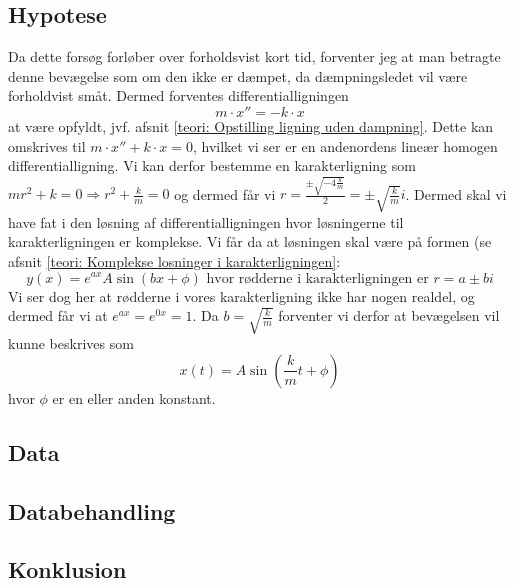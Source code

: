 \subsection{Hypotese}
Da dette forsøg forløber over forholdsvist kort tid, forventer jeg at man betragte denne bevægelse som om den ikke er dæmpet, da dæmpningsledet vil være forholdvist småt. 
Dermed forventes differentialligningen 
$$m\cdot x'' = -k \cdot x$$
at være opfyldt, jvf. afsnit \ref{teori: Opstilling ligning uden dampning}.
Dette kan omskrives til $m\cdot x'' + k\cdot x=0$, hvilket vi ser er en andenordens lineær homogen differentialligning. 
Vi kan derfor bestemme en karakterligning som $mr^2 + k = 0 \Rightarrow r^2 + \frac{k}{m} = 0$ og dermed får vi $r = \frac{\pm \sqrt{-4\frac{k}{m}}}{2}=\pm\sqrt{\frac{k}{m}}i$.
Dermed skal vi have fat i den løsning af differentialligningen hvor løsningerne til karakterligningen er komplekse. 
Vi får da at løsningen skal være på formen (se afsnit \ref{teori: Komplekse losninger i karakterligningen}:
$$y(x) = e^{ax}A\sin(bx+\phi) \text{ hvor rødderne i karakterligningen er } r = a \pm bi$$
Vi ser dog her at rødderne i vores karakterligning ikke har nogen realdel, og dermed får vi at $e^{ax}=e^{0x}=1$.
Da $b=\sqrt{\frac{k}{m}}$ forventer vi derfor at bevægelsen vil kunne beskrives som 
$$x(t)=A\sin (\frac{k}{m}t+\phi)$$
hvor $\phi$ er en eller anden konstant. 


\subsection{Data}

\subsection{Databehandling}

\subsection{Konklusion}


